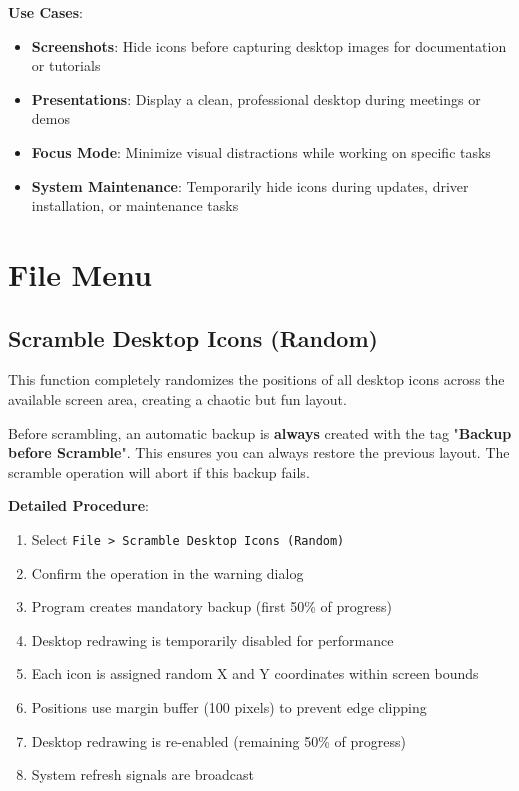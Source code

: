 \documentclass[a4paper,11pt]{article}
\begin{document}
\textbf{Use Cases}:
\begin{itemize}
  \item \textbf{Screenshots}: Hide icons before capturing desktop images
    for documentation or tutorials
  \item \textbf{Presentations}: Display a clean, professional desktop
    during meetings or demos
  \item \textbf{Focus Mode}: Minimize visual distractions while working
    on specific tasks
  \item \textbf{System Maintenance}: Temporarily hide icons during
    updates, driver installation, or maintenance tasks
\end{itemize}

\section{File Menu}

\subsection{Scramble Desktop Icons (Random)}

This function completely randomizes the positions of all desktop
icons across the available screen area, creating a chaotic but fun layout.

\begin{warningbox}
  Before scrambling, an automatic backup is \textbf{always} created
  with the tag "\textbf{Backup before Scramble}". This ensures
  you can always restore the previous layout. The scramble operation
  will abort if this backup fails.
\end{warningbox}

\textbf{Detailed Procedure}:
\begin{enumerate}
  \item Select \texttt{File > Scramble Desktop Icons (Random)}
  \item Confirm the operation in the warning dialog
  \item Program creates mandatory backup (first 50\% of progress)
  \item Desktop redrawing is temporarily disabled for performance
  \item Each icon is assigned random X and Y coordinates within screen bounds
  \item Positions use margin buffer (100 pixels) to prevent edge clipping
  \item Desktop redrawing is re-enabled (remaining 50\% of progress)
  \item System refresh signals are broadcast
\end{enumerate}
\end{document}
